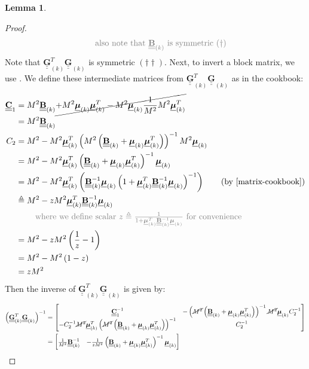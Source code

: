 \documentclass{article}
\newcommand{\bmat}[1]{\begin{bmatrix}#1\end{bmatrix}}
\theoremstyle{definition}
\newtheorem{lemma}[theorem]{Lemma}
\newcommand{\textgrey}[1]{\textcolor{gray}{#1}}
\def\vts#1{\underline{\boldsymbol{#1}}}
\def\mt#1{\underline{\underline{\mathbf{#1}}}}
\begin{document}
\begin{lemma}
\begin{proof}
\begin{align*}
            &\quad\quad\ \textgrey{\text{also note that $\mt B_{(k)}$ is symmetric $(\dagger)$}}
        \end{align*}
        Note that $\mt G_{(k)}^T \mt G_{(k)}$ is symmetric $(\dagger\dagger)$. Next, to invert a block matrix, we use \cite[\S9.1.3]{matrix-cookbook}. We define these intermediate matrices from $\mt G_{(k)}^T \mt G_{(k)}$ as in the cookbook:
        \begin{align*}
            \mt C_1 &= M^2\mt B_{(k)} \cancel{+ M^2\vts\mu_{(k)}\vts\mu_{(k)}^T - M^2\vts\mu_{(k)}\frac1{M^2}M^2\vts\mu_{(k)}^T}\\
            &= M^2 \mt B_{(k)}\\
            C_2 &= M^2 - M^2\vts \mu_{(k)}^T \left(M^2\left(\mt B_{(k)} + \vts\mu_{(k)}\vts\mu_{(k)}^T\right)\right)^{-1}M^2\vts \mu_{(k)}\\
            &= M^2 - M^2\vts \mu_{(k)}^T \left(\mt B_{(k)} + \vts\mu_{(k)}\vts\mu_{(k)}^T\right)^{-1}\vts \mu_{(k)}\\
            &= M^2 - M^2\vts \mu_{(k)}^T\left(\mt B_{(k)}^{-1}\vts\mu_{(k)}\left(1 + \vts\mu_{(k)}^T \mt B_{(k)}^{-1} \vts\mu_{(k)}\right)^{-1}\right)  \qquad\text{(by \cite[eq.\ (162)]{matrix-cookbook})}\\
            &\triangleq M^2 - zM^2\vts \mu_{(k)}^T\mt B_{(k)}^{-1}\vts\mu_{(k)}\\
            &\quad\quad\ \textgrey{\text{where we define scalar $z\triangleq \tfrac1{1 + \vts\mu_{(k)}^T \mt B_{(k)}^{-1} \vts\mu_{(k)}}$ for convenience}}\\
            &= M^2 - zM^2 \left(\frac1z - 1\right)\\
            &= M^2 - M^2 \left(1-z \right)\\
            &= zM^2
        \end{align*}
        Then the inverse of $\mt G_{(k)}^T \mt G_{(k)}$ is given by:
        \begin{align*}
            \left(\mt G_{(k)}^T \mt G_{(k)}\right)^{-1} &= \bmat{
                \mt C_1^{-1} & -\left(\cancel{M^2} \left(\mt B_{(k)} + \vts\mu_{(k)}\vts\mu_{(k)}^T\right)\right)^{-1}\cancel{M^2}\vts \mu_{(k)}C_2^{-1}\\
                -C_2^{-1}\cancel{M^2}\vts\mu_{(k)}^T\left(\cancel{M^2} \left(\mt B_{(k)} + \vts\mu_{(k)}\vts\mu_{(k)}^T\right)\right)^{-1} & C_2^{-1}
            }\\
            &= \bmat{
                \frac1{M^2} \mt B_{(k)}^{-1}  & -\frac1{zM^2}\left(\mt B_{(k)} + \vts\mu_{(k)}\vts\mu_{(k)}^T\right)^{-1}\vts\mu_{(k)} \\
}
\end{align*}
\end{proof}
\end{lemma}
\end{document}
